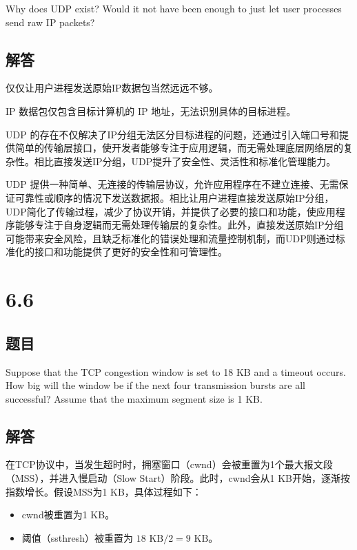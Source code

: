 \documentclass[14pt,a4paper,UTF8,twoside]{article}
\begin{document}
Why does UDP exist? Would it not have been enough to just let user processes send raw IP packets?

\subsection*{解答}

仅仅让用户进程发送原始IP数据包当然远远不够。

IP 数据包仅包含目标计算机的 IP 地址，无法识别具体的目标进程。

UDP 的存在不仅解决了IP分组无法区分目标进程的问题，还通过引入端口号和提供简单的传输层接口，使开发者能够专注于应用逻辑，而无需处理底层网络层的复杂性。相比直接发送IP分组，UDP提升了安全性、灵活性和标准化管理能力。

\begin{ctt}
UDP 提供一种简单、无连接的传输层协议，允许应用程序在不建立连接、无需保证可靠性或顺序的情况下发送数据报。相比让用户进程直接发送原始IP分组，UDP简化了传输过程，减少了协议开销，并提供了必要的接口和功能，使应用程序能够专注于自身逻辑而无需处理传输层的复杂性。此外，直接发送原始IP分组可能带来安全风险，且缺乏标准化的错误处理和流量控制机制，而UDP则通过标准化的接口和功能提供了更好的安全性和可管理性。
\end{ctt}

\section{6.6}

\subsection*{题目}

Suppose that the TCP congestion window is set to 18 KB and a timeout occurs. How big will the window be if the next four transmission bursts are all successful? Assume that the maximum segment size is 1 KB.

\subsection*{解答}

在TCP协议中，当发生超时时，拥塞窗口（cwnd）会被重置为1个最大报文段（MSS），并进入慢启动（Slow Start）阶段。此时，cwnd会从1 KB开始，逐渐按指数增长。假设MSS为1 KB，具体过程如下：

   \begin{itemize}
       \item cwnd被重置为1 KB。
       \item 阈值（ssthresh）被重置为 $ \text{18 KB}/2 = 9 \text{ KB}$。
   \end{itemize}
\end{document}
